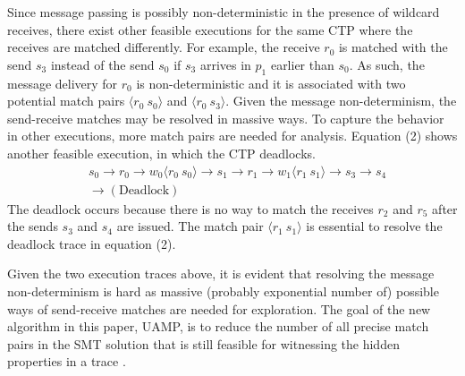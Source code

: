 Since message passing is possibly non-deterministic in the presence of wildcard receives, there exist other feasible executions for the same CTP where the receives are matched differently. For example,  the receive $r_0$ is matched with the send $s_3$ instead of the send $s_0$ if $s_3$ arrives in $p_1$ earlier than $s_0$. As such, the message delivery for $r_0$ is non-deterministic and it is associated with two potential match pairs $\langle r_0\ s_0\rangle$ and $\langle r_0\ s_3\rangle$. 
Given the message non-determinism, the send-receive matches may be resolved in massive ways. 
To capture the behavior in other executions, more match pairs are needed for analysis.
Equation (2) shows another feasible execution, in which the CTP deadlocks. 
\begin{equation}
\begin{split}
& s_0\rightarrow r_0\rightarrow w_0\langle r_0\ s_0\rangle \rightarrow s_1\rightarrow r_1\rightarrow w_1\langle r_1\ s_1\rangle \rightarrow s_3\rightarrow s_4 \\ 
& \rightarrow (\mathrm{Deadlock})
\end{split}
\end{equation} 
The deadlock occurs because there is no way to match the receives $r_2$ and $r_5$ after the sends $s_3$ and $s_4$ are issued. 
The match pair $\langle r_1\ s_1\rangle$ is essential to resolve the deadlock trace in equation (2).

Given the two execution traces above, it is evident that resolving the message non-determinism is hard as massive (probably exponential number of) possible ways of send-receive matches are needed for exploration.
The goal of the new algorithm in this paper, UAMP, is to reduce the number of all precise match pairs in the SMT solution that is still feasible for witnessing the hidden properties in a trace .

